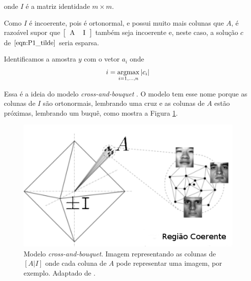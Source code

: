 onde $I$ é a matriz identidade $m \times m$.

Como $I$ é incoerente, pois é ortonormal, e possui muito mais colunas que $A$, é razoável supor que $\left[\begin{tabular}{c c} A &  I \end{tabular} \right]$ também seja incoerente e, neste caso, a solução $c$ de $\eqref{eqn:P1_tilde}$ seria esparsa.

Identificamos a amostra $y$ com o vetor $a_i$ onde
$$i = \argmax_{i = 1, \hdots, n} \vert c_i \vert$$

Essa é a ideia do modelo \textit{cross-and-bouquet} \cite{wrima}. O modelo tem esse nome porque as colunas de $I$ são ortonormais, lembrando uma cruz e as colunas de $A$ estão próximas, lembrando um buquê, como mostra a Figura \ref{fig:cross_bouquet}.

\begin{figure}
\centering
\includegraphics[scale=.6]{imagens/cross-and-bouquet.png}
\caption{Modelo \textit{cross-and-bouquet}. Imagem representando as colunas de $\left[ A \vert I \right]$ onde cada coluna de $A$ pode representar uma imagem, por exemplo. Adaptado de \cite{yangetal}.}
\label{fig:cross_bouquet}
\end{figure}